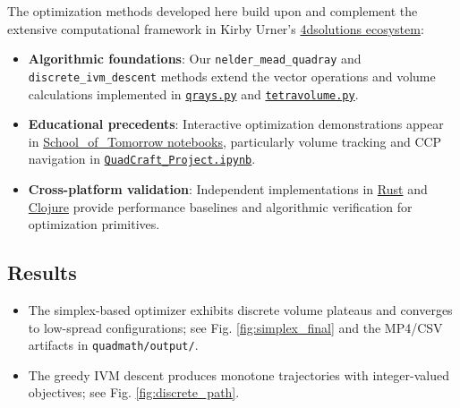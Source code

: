 \documentclass[
]{article}
\providecommand{\tightlist}{%
  \setlength{\itemsep}{0pt}\setlength{\parskip}{0pt}}
\begin{document}
The optimization methods developed here build upon and complement the
extensive computational framework in Kirby Urner's
\href{https://github.com/4dsolutions}{4dsolutions ecosystem}:

\begin{itemize}
\item
  \textbf{Algorithmic foundations}: Our \texttt{nelder\_mead\_quadray}
  and \texttt{discrete\_ivm\_descent} methods extend the vector
  operations and volume calculations implemented in
  \href{https://github.com/4dsolutions/m4w/blob/main/qrays.py}{\texttt{qrays.py}}
  and
  \href{https://github.com/4dsolutions/m4w/blob/main/tetravolume.py}{\texttt{tetravolume.py}}.
\item
  \textbf{Educational precedents}: Interactive optimization
  demonstrations appear in
  \href{https://github.com/4dsolutions/School_of_Tomorrow}{School\_of\_Tomorrow
  notebooks}, particularly volume tracking and CCP navigation in
  \href{https://github.com/4dsolutions/School_of_Tomorrow/blob/master/QuadCraft_Project.ipynb}{\texttt{QuadCraft\_Project.ipynb}}.
\item
  \textbf{Cross-platform validation}: Independent implementations in
  \href{https://github.com/4dsolutions/rusty_rays}{Rust} and
  \href{https://github.com/4dsolutions/synmods}{Clojure} provide
  performance baselines and algorithmic verification for optimization
  primitives.
\end{itemize}

\hypertarget{results}{%
\subsection{Results}\label{results}}

\begin{itemize}
\tightlist
\item
  The simplex-based optimizer exhibits discrete volume plateaus and
  converges to low-spread configurations; see Fig.
  \ref{fig:simplex_final} and the MP4/CSV artifacts in
  \texttt{quadmath/output/}.
\item
  The greedy IVM descent produces monotone trajectories with
  integer-valued objectives; see Fig. \ref{fig:discrete_path}.
\end{itemize}
\end{document}
